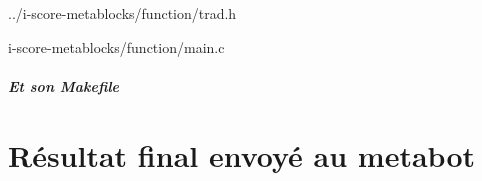 \documentclass[10pt,a4paper]{report}
\begin{document}
\begin{appendices}



{../i-score-metablocks/function/trad.h}
\newpage



{i-score-metablocks/function/main.c}

\paragraph{Et son Makefile}


\chapter{Résultat final envoyé au metabot} 


\end{appendices} 
\end{document}
